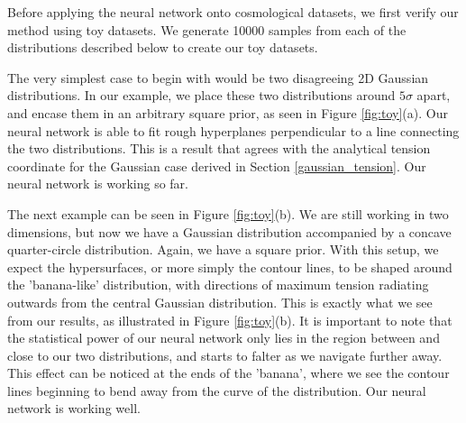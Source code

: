 \documentclass[%
 reprint,
 amsmath,amssymb,
 aps,
]{revtex4-2}
\begin{document}
Before applying the neural network onto cosmological datasets, we first verify our method using toy datasets. We generate 10000 samples from each of the distributions described below to create our toy datasets.

The very simplest case to begin with would be two disagreeing 2D Gaussian distributions. In our example, we place these two distributions around $5\sigma$ apart, and encase them in an arbitrary square prior, as seen in Figure \ref{fig:toy}(a). Our neural network is able to fit rough hyperplanes perpendicular to a line connecting the two distributions. This is a result that agrees with the analytical tension coordinate for the Gaussian case derived in Section \ref{gaussian_tension}. Our neural network is working so far.

The next example can be seen in Figure \ref{fig:toy}(b). We are still working in two dimensions, but now we have a Gaussian distribution accompanied by a concave quarter-circle distribution. Again, we have a square prior. With this setup, we expect the hypersurfaces, or more simply the contour lines, to be shaped around the 'banana-like' distribution, with directions of maximum tension radiating outwards from the central Gaussian distribution. This is exactly what we see from our results, as illustrated in Figure \ref{fig:toy}(b). It is important to note that the statistical power of our neural network only lies in the region between and close to our two distributions, and starts to falter as we navigate further away. This effect can be noticed at the ends of the 'banana', where we see the contour lines beginning to bend away from the curve of the distribution. Our neural network is working well.
\end{document}
